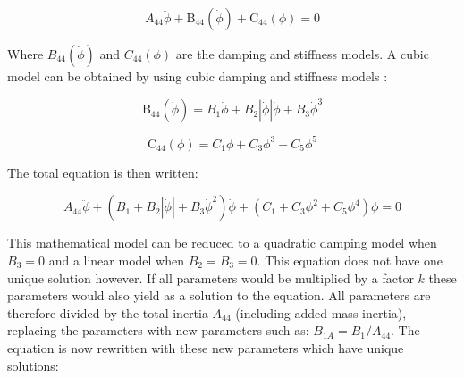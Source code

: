             
    
    \begin{equation}
A_{44} \ddot{\phi} + \operatorname{B_{44}}\left(\dot{\phi}\right) + \operatorname{C_{44}}\left(\phi\right) = 0
\label{eq:roll_decay_equation_general_himeno}
\end{equation}

    

    Where $B_{44}(\dot{\phi})$ and $C_{44}(\phi)$ are the damping and
stiffness models. A cubic model can be obtained by using cubic damping
\citep{7505983/FB64RGPF} and stiffness models \citep{7505983/KL7A3RIV}:
 
            
    
    \begin{equation}
\operatorname{B_{44}}\left(\dot{\phi}\right) = B_{1} \dot{\phi} + B_{2} \left|{\dot{\phi}}\right| \dot{\phi} + B_{3} \dot{\phi}^{3}
\label{eq:b44_cubic_equation}
\end{equation}

    
 
            
    
    \begin{equation}
\operatorname{C_{44}}\left(\phi\right) = C_{1} \phi + C_{3} \phi^{3} + C_{5} \phi^{5}
\label{eq:restoring_equation_cubic}
\end{equation}

    

    The total equation is then written:
 
            
    
    \begin{equation}
A_{44} \ddot{\phi} + \left(B_{1} + B_{2} \left|{\dot{\phi}}\right| + B_{3} \dot{\phi}^{2}\right) \dot{\phi} + \left(C_{1} + C_{3} \phi^{2} + C_{5} \phi^{4}\right) \phi = 0
\label{eq:roll_decay_equation_cubic}
\end{equation}

    

    This mathematical model can be reduced to a quadratic damping model when
$B_3=0$ and a linear model when $B_2=B_3=0$. This equation does not
have one unique solution however. If all parameters would be multiplied
by a factor $k$ these parameters would also yield as a solution to the
equation. All parameters are therefore divided by the total inertia
$A_{44}$ (including added mass inertia), replacing the parameters with
new parameters such as: $B_{1A} = B_1/A_{44}$. The equation is now
rewritten with these new parameters which have unique solutions:
 

